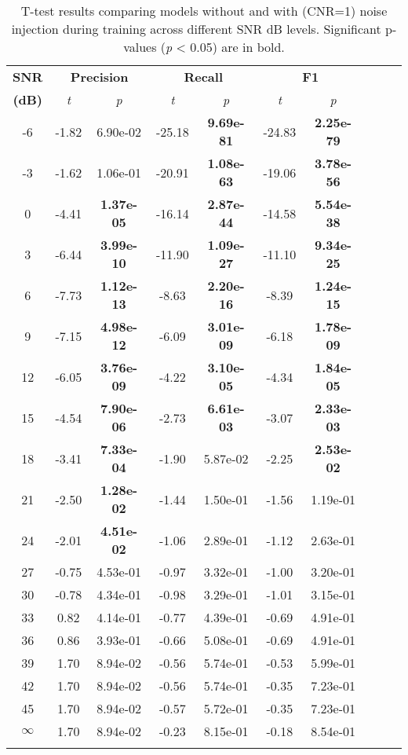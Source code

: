 \documentclass{article}
\begin{document}
\begin{table}[h!]
\centering
\caption{T-test results comparing models without and with (CNR=1) noise injection during training across different SNR dB levels. Significant p-values (\textit{p} < 0.05) are in bold.}
\scriptsize
\begin{tabular}{@{}c ccc ccc ccc@{}} %
\toprule
\textbf{SNR} & \multicolumn{2}{c}{\textbf{Precision}} & \multicolumn{2}{c}{\textbf{Recall}} & \multicolumn{2}{c}{\textbf{F1}} \\ 
\textbf{(dB)} & \textit{t} & \textit{p} & \textit{t} & \textit{p} & \textit{t} & \textit{p} \\
\midrule
-6  & -1.82  & 6.90e-02  & -25.18  & \textbf{9.69e-81}  & -24.83  & \textbf{2.25e-79} \\
-3  & -1.62  & 1.06e-01  & -20.91  & \textbf{1.08e-63}  & -19.06  & \textbf{3.78e-56} \\
0   & -4.41  & \textbf{1.37e-05}  & -16.14  & \textbf{2.87e-44}  & -14.58  & \textbf{5.54e-38} \\
3   & -6.44  & \textbf{3.99e-10}  & -11.90  & \textbf{1.09e-27}  & -11.10  & \textbf{9.34e-25} \\
6   & -7.73  & \textbf{1.12e-13}  & -8.63   & \textbf{2.20e-16}  & -8.39   & \textbf{1.24e-15} \\
9   & -7.15  & \textbf{4.98e-12}  & -6.09   & \textbf{3.01e-09}  & -6.18   & \textbf{1.78e-09} \\
12  & -6.05  & \textbf{3.76e-09}  & -4.22   & \textbf{3.10e-05}  & -4.34   & \textbf{1.84e-05} \\
15  & -4.54  & \textbf{7.90e-06}  & -2.73   & \textbf{6.61e-03}  & -3.07   & \textbf{2.33e-03} \\
18  & -3.41  & \textbf{7.33e-04}  & -1.90   & 5.87e-02  & -2.25   & \textbf{2.53e-02} \\
21  & -2.50  & \textbf{1.28e-02}  & -1.44   & 1.50e-01  & -1.56   & 1.19e-01 \\
24  & -2.01  & \textbf{4.51e-02}  & -1.06   & 2.89e-01  & -1.12   & 2.63e-01 \\
27  & -0.75  & 4.53e-01  & -0.97   & 3.32e-01  & -1.00   & 3.20e-01 \\
30  & -0.78  & 4.34e-01  & -0.98   & 3.29e-01  & -1.01   & 3.15e-01 \\
33  & 0.82   & 4.14e-01  & -0.77   & 4.39e-01  & -0.69   & 4.91e-01 \\
36  & 0.86   & 3.93e-01  & -0.66   & 5.08e-01  & -0.69   & 4.91e-01 \\
39  & 1.70   & 8.94e-02  & -0.56   & 5.74e-01  & -0.53   & 5.99e-01 \\
42  & 1.70   & 8.94e-02  & -0.56   & 5.74e-01  & -0.35   & 7.23e-01 \\
45  & 1.70   & 8.94e-02  & -0.57   & 5.72e-01  & -0.35   & 7.23e-01 \\
$\infty$ & 1.70   & 8.94e-02  & -0.23   & 8.15e-01  & -0.18   & 8.54e-01 \\
\bottomrule
\label{tab:1}
\end{tabular}
\end{table}
\end{document}
